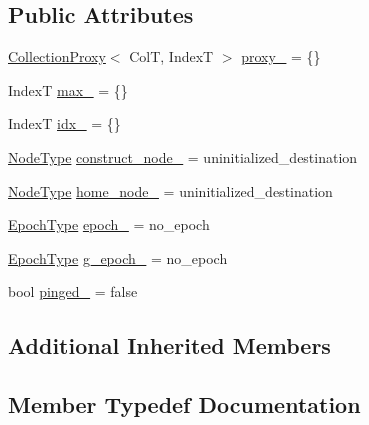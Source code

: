 \subsection*{Public Attributes}
\begin{DoxyCompactItemize}
\item 
\hyperlink{structvt_1_1vrt_1_1collection_1_1_collection_proxy}{Collection\+Proxy}$<$ ColT, IndexT $>$ \hyperlink{structvt_1_1vrt_1_1collection_1_1_insert_msg_a7f679b8e031239c31fe8061e9a18f568}{proxy\+\_\+} = \{\}
\item 
IndexT \hyperlink{structvt_1_1vrt_1_1collection_1_1_insert_msg_a8e6cba1aa922c74d219db407343530b1}{max\+\_\+} = \{\}
\item 
IndexT \hyperlink{structvt_1_1vrt_1_1collection_1_1_insert_msg_a34ee4c02fcf0ae389eb0f11a44033ccc}{idx\+\_\+} = \{\}
\item 
\hyperlink{namespacevt_a866da9d0efc19c0a1ce79e9e492f47e2}{Node\+Type} \hyperlink{structvt_1_1vrt_1_1collection_1_1_insert_msg_a58fd21706a7cf67fc92d19facb9b260a}{construct\+\_\+node\+\_\+} = uninitialized\+\_\+destination
\item 
\hyperlink{namespacevt_a866da9d0efc19c0a1ce79e9e492f47e2}{Node\+Type} \hyperlink{structvt_1_1vrt_1_1collection_1_1_insert_msg_a0ab2ebbf58c63307eb4b7e0794cd60d8}{home\+\_\+node\+\_\+} = uninitialized\+\_\+destination
\item 
\hyperlink{namespacevt_a985a5adf291c34a3ca263b3378388236}{Epoch\+Type} \hyperlink{structvt_1_1vrt_1_1collection_1_1_insert_msg_adb7966a80d37bddff7a1d1e3eaba880e}{epoch\+\_\+} = no\+\_\+epoch
\item 
\hyperlink{namespacevt_a985a5adf291c34a3ca263b3378388236}{Epoch\+Type} \hyperlink{structvt_1_1vrt_1_1collection_1_1_insert_msg_a7d080a6dc4e89607097f79e751dbbd70}{g\+\_\+epoch\+\_\+} = no\+\_\+epoch
\item 
bool \hyperlink{structvt_1_1vrt_1_1collection_1_1_insert_msg_af58c873ef6a1c91a5a3d8cbf9de619a1}{pinged\+\_\+} = false
\end{DoxyCompactItemize}
\subsection*{Additional Inherited Members}


\subsection{Member Typedef Documentation}
\mbox{\label{structvt_1_1vrt_1_1collection_1_1_insert_msg_a04da6eeb695c98c1bb15837cfa2984c0}} 
